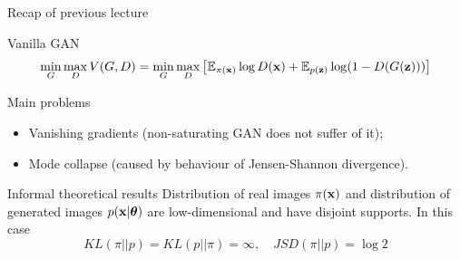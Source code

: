 

\begin{frame}
\titlepage
\end{frame}
\begin{frame}{Recap of previous lecture}
	\begin{block}{Vanilla GAN}
		\vspace{-0.5cm}
		\[
			\min_{G} \max_D V(G, D) = \min_{G} \max_D \left[ \mathbb{E}_{\pi(\mathbf{x})} \log D(\mathbf{x}) + \mathbb{E}_{p(\mathbf{z})} \log (1 - D(G(\mathbf{z}))) \right]
		\]
		\vspace{-0.7cm}
	\end{block}
	\begin{block}{Main problems}
		\begin{itemize}
			\item Vanishing gradients (non-saturating GAN does not suffer of it);
			\item Mode collapse (caused by behaviour of Jensen-Shannon divergence).
		\end{itemize}
	\end{block}
	\vspace{-0.1cm}
	\begin{block}{Informal theoretical results}
		Distribution of real images $\pi(\mathbf{x})$ and distribution of generated images $p(\mathbf{x} | \boldsymbol{\theta})$ are low-dimensional and have disjoint supports. In this case
		\vspace{-0.3cm}
		\[
			KL(\pi || p) = KL(p || \pi) = \infty, \quad JSD(\pi || p) = \log 2
		\]
		\end{block}
\end{frame}
